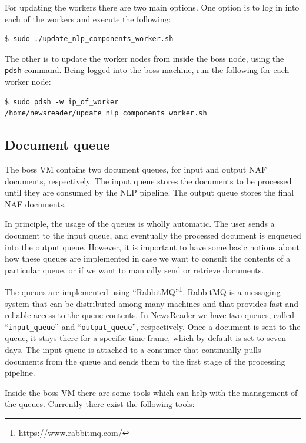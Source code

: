 \documentclass[a4]{article}
\begin{document}
For updating the workers there are two main options. One option is to log in
into each of the workers and execute the following:

\begin{verbatim}
$ sudo ./update_nlp_components_worker.sh
\end{verbatim}

The other is to update the worker nodes from inside the boss node, using the
\texttt{pdsh} command. Being logged into the boss machine, run the
following for each worker node:

\begin{verbatim}
$ sudo pdsh -w ip_of_worker /home/newsreader/update_nlp_components_worker.sh
\end{verbatim}

\subsection{Document queue}
\label{sec:document-queue}

The boss VM contains two document queues, for input and output NAF
documents, respectively. The input queue stores the documents to be
processed until they are consumed by the NLP pipeline. The output queue
stores the final NAF documents.

In principle, the usage of the queues is wholly automatic. The user sends a
document to the input queue, and eventually the processed document is
enqueued into the output queue. However, it is important to have some basic
notions about how these queues are implemented in case we want to consult
the contents of a particular queue, or if we want to manually send or
retrieve documents.

The queues are implemented using
``RabbitMQ''\footnote{\url{https://www.rabbitmq.com/}}. RabbitMQ is a
messaging system that can be distributed among many machines and that
provides fast and reliable access to the queue contents. In NewsReader
we have two queues, called ``\texttt{input\_queue}'' and
``\texttt{output\_queue}'', respectively. Once a document is sent to
the queue, it stays there for a specific time frame, which by default
is set to seven days. The input queue is attached to a consumer that
continually pulls documents from the queue and sends them to the first
stage of the processing pipeline.

Inside the boss VM there are some tools which can help with the management
of the queues. Currently there exist the following tools:
\end{document}
